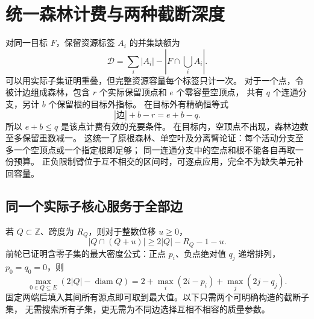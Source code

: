 \documentclass[11pt,a4paper]{article}
\newcommand{\Z}{\mathbb Z}
\begin{document}
\section{统一森林计费与两种截断深度}\label{adaptive}
对同一目标 $F$，保留资源标签 $A_i$ 的并集缺额为
\[\mathcal D=\sum_i|A_i|-|F\cap\bigcup_iA_i|.\]
可以用实际子集证明重叠，但完整资源容量每个标签只计一次。
对于一个点，令被计边组成森林，包含 $r$ 个实际保留顶点和 $e$ 个零容量空顶点，
共有 $q$ 个连通分支，另计 $b$ 个保留根的目标外指标。
在目标外有精确恒等式
\[|\text{边}|+b-r=e+b-q.\]
所以 $e+b\le q$ 是该点计费有效的充要条件。
在目标内，空顶点不出现，森林边数至多保留重数减一。
这统一了原根森林、单空叶及分离臂论证：每个活动分支至多一个空顶点或一个指定根即足够；
同一连通分支中的空点和根不能各自再取一份预算。
正负限制臂位于互不相交的区间时，可逐点应用，完全不为缺失单元补回容量。

\subsection*{同一个实际子核心服务于全部边}
若 $Q\subset\Z$、跨度为 $R_Q$，则对于整数位移 $u\ge0$，
\[|Q\cap(Q+u)|\ge2|Q|-R_Q-1-u.\]
前轮已证明含零子集的最大密度公式：正点 $p_i$、负点绝对值 $q_j$ 递增排列，$p_0=q_0=0$，则
\[
\max_{0\in Q\subseteq E}(2|Q|-\operatorname{diam}Q)
=2+\max_i(2i-p_i)+\max_j(2j-q_j).
\]
固定两端后填入其间所有源点即可取到最大值。以下只需两个可明确构造的截断子集，
无需搜索所有子集，更无需为不同边选择互相不相容的质量参数。
\end{document}
